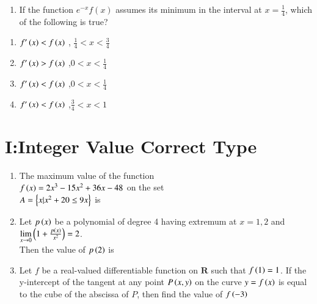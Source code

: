 \documentclass[journal,,12pt,twocolumn]{IEEEtran}
\theoremstyle{remark}
\begin{document}
\begin{enumerate}
\begin{enumerate}
\end{enumerate}


\item If the function $e^{-x}f(x)$ assumes its minimum in the interval  at $x=\frac{1}{4}$, which of the following is true?
\end{enumerate}

\hfill{}

\begin{enumerate}

\item $f'\left(x\right)<f\left(x\right)$ , $\frac{1}{4}<x<\frac{3}{4}$ \\

\item $f'\left(x\right)>f\left(x\right)$ ,$0<x<\frac{1}{4}$ \\ 

\item $f'\left(x\right)<f\left(x\right)$ ,$0<x<\frac{1}{4}$ \\

\item $f'\left(x\right)<f\left(x\right)$ ,$\frac{3}{4}<x<1$ \\


\end{enumerate}


\section*{I:Integer Value Correct Type}

\begin{enumerate}
\item The maximum value of the function \\
$f\left(x\right)=2x^3-15x^2+36x-48$ on the set\\
$A=\left\{x|x^2+20 \le 9x\right\}$ is

\hfill {}

\item Let $p\left(x\right)$ be a polynomial of degree 4 having extremum at $x=1,2 $ and $\lim \limits_{x\to 0} \left(1+\frac{p\left(x\right)}{x^2}\right) = 2$.\\
Then the value of $p\left(2\right)$ is
\hfill {}
\item Let $f$ be a real-valued differentiable function on $\textbf{R}$ such that $f\left(1\right)=1$. If the y-intercept of the tangent at any point $P\left(x,y\right)$ on the curve $y=f\left(x\right)$ is equal to the cube of the abscissa of $P$, then find the value of $f\left(-3\right)$

    \hfill {}


\end{enumerate}
\end{document}
